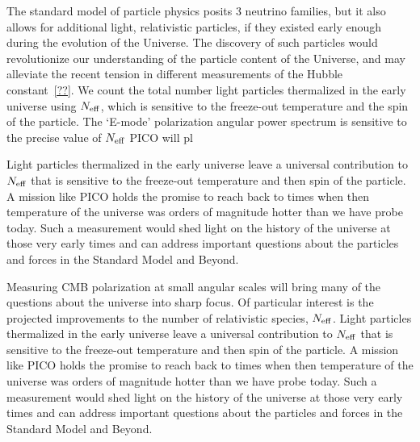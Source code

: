 \documentclass[PICOReport.tex]{subfiles}
\begin{document}
The standard model of particle physics posits 3 neutrino families, but it also allows for additional light, relativistic particles, if 
they existed early enough during the evolution of the Universe. The discovery of such particles would revolutionize our understanding
of the particle content of the Universe, 
and may alleviate the recent tension in different measurements of the Hubble constant~\ref{??}.  We count the total number 
light particles thermalized in the early universe using ${N_{\rm eff}}$, which is sensitive to the freeze-out temperature and 
the spin of the particle. The `E-mode' polarization angular power spectrum is sensitive to the precise value of ${N_{\rm eff}}$ PICO 
will pl

Light particles thermalized in the early universe leave a universal contribution to ${N_{\rm eff}}$ that is sensitive to the freeze-out temperature and then spin of the particle.  A mission like PICO holds the promise to reach back to times when then temperature of the universe was orders of magnitude hotter than we have probe today.  Such a measurement would shed light on the history of the universe at those very early times and can address important questions about the particles and forces in the Standard Model and Beyond.



Measuring CMB polarization at small angular scales will bring many of the questions about the universe into sharp focus.  Of particular interest is the projected improvements to the number of relativistic species, ${N_{\rm eff}}$.  Light particles thermalized in the early universe leave a universal contribution to ${N_{\rm eff}}$ that is sensitive to the freeze-out temperature and then spin of the particle.  A mission like PICO holds the promise to reach back to times when then temperature of the universe was orders of magnitude hotter than we have probe today.  Such a measurement would shed light on the history of the universe at those very early times and can address important questions about the particles and forces in the Standard Model and Beyond. 
\end{document}
